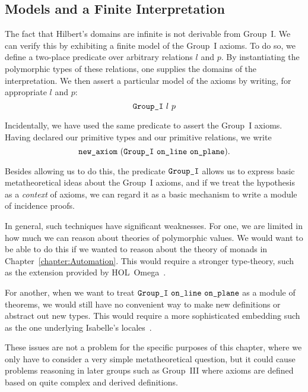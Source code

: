 \subsection{Models and a Finite Interpretation}\label{sec:FiniteModel}
The fact that Hilbert's domains are infinite is not derivable from Group~I. We can verify this by exhibiting a finite model of the Group~I axioms. To do so, we define a two-place predicate  over arbitrary relations $l$ and $p$. By instantiating the polymorphic types of these relations, one supplies the domains of the interpretation. We then assert a particular model of the axioms by writing, for appropriate $l$ and $p$:
\begin{displaymath}
\texttt{Group\_I}\ l\ p
\end{displaymath}

Incidentally, we have used the same predicate to assert the Group~I axioms. Having declared our primitive types and our primitive relations, we write
\begin{displaymath}
  \code{new\_axiom}\ (\code{Group\_I}\ \code{on\_line}\ \code{on\_plane}).
\end{displaymath}

Besides allowing us to do this, the predicate $\texttt{Group\_I}$ allows us to express basic metatheoretical ideas about the Group~I axioms, and if we treat the hypothesis as a \emph{context} of axioms, we can regard it as a basic mechanism to write a module of incidence proofs. 

In general, such techniques have significant weaknesses. For one, we are limited in how much we can reason about theories of polymorphic values. We would want to be able to do this if we wanted to reason about the theory of monads in Chapter~\ref{chapter:Automation}. This would require a stronger type-theory, such as the extension provided by HOL~Omega~\cite{HOLOmega}.

For another, when we want to treat $\code{Group\_I}\ \code{on\_line}\ \code{on\_plane}$ as a module of theorems, we would still have no convenient way to make new definitions or abstract out new types. This would require a more sophisticated embedding such as the one underlying Isabelle's locales~\cite{IsabelleLocales}.

These issues are not a problem for the specific purposes of this chapter, where we only have to consider a very simple metatheoretical question, but it could cause problems reasoning in later groups such as Group~III where axioms are defined based on quite complex and derived definitions.

